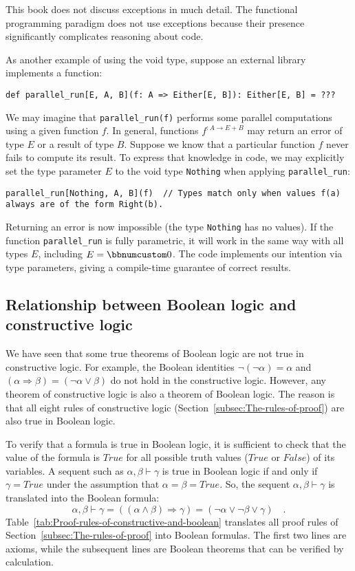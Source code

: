 This book does not discuss exceptions in much detail. The functional
programming paradigm does not use exceptions because their presence
significantly complicates reasoning about code.

As another example of using the void type, suppose an external library
implements a function:
\begin{lstlisting}
def parallel_run[E, A, B](f: A => Either[E, B]): Either[E, B] = ???
\end{lstlisting}
We may imagine that \lstinline!parallel_run(f)! performs some parallel
computations using a given function $f$. In general, functions $f^{:A\rightarrow E+B}$
may return an error of type $E$ or a result of type $B$. Suppose
we know that a particular function $f$ never fails to compute its
result. To express that knowledge in code, we may explicitly set the
type parameter $E$ to the void type \lstinline!Nothing! when applying
\lstinline!parallel_run!:
\begin{lstlisting}
parallel_run[Nothing, A, B](f)  // Types match only when values f(a) always are of the form Right(b). 
\end{lstlisting}
Returning an error is now impossible (the type \lstinline!Nothing!
has no values). If the function \lstinline!parallel_run! is fully
parametric, it will work in the same way with all types $E$, including
$E=\bbnum 0$. The code implements our intention via type parameters,
giving a compile-time guarantee of correct results.

\subsection{Relationship between Boolean logic and constructive logic\label{subsec:Relationship-between-Boolean} }

We have seen that some true theorems of Boolean logic are not true
in constructive logic. For example, the Boolean identities $\neg\left(\neg\alpha\right)=\alpha$
and $\left(\alpha\Rightarrow\beta\right)=(\neg\alpha\vee\beta)$ do
not hold in the constructive logic. However, any theorem of constructive
logic is also a theorem of Boolean logic. The reason is that all eight
rules of constructive logic (Section~\ref{subsec:The-rules-of-proof})
are also true in Boolean logic.

To verify that a formula is true in Boolean logic, it is sufficient
 to check that the value of the formula is $True$ for all possible
truth values ($True$ or $False$) of its variables. A sequent such
as $\alpha,\beta\vdash\gamma$ is true in Boolean logic if and only
if $\gamma=True$ under the assumption that $\alpha=\beta=True$.
So, the sequent $\alpha,\beta\vdash\gamma$ is translated into the
Boolean formula:
\[
\alpha,\beta\vdash\gamma=\left(\left(\alpha\wedge\beta\right)\Rightarrow\gamma\right)=\left(\neg\alpha\vee\neg\beta\vee\gamma\right)\quad.
\]
Table~\ref{tab:Proof-rules-of-constructive-and-boolean} translates
all proof rules of Section~\ref{subsec:The-rules-of-proof} into
Boolean formulas. The first two lines are axioms, while the subsequent
lines are Boolean theorems that can be verified by calculation.

